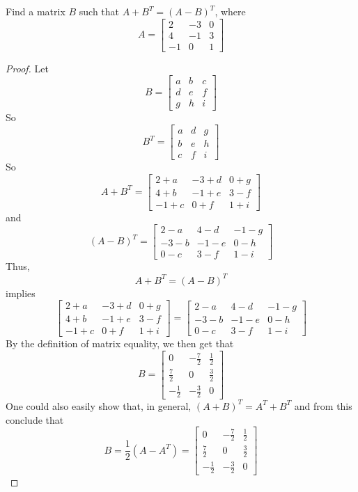 \begin{problem} \label{P.1.6}
    Find a matrix \( B \) such that \( A + B^T = (A-B)^T \), where
    \[
    A = \left[ 
    \begin{array}{ccc}
        2 & -3 & 0 \\
        4 & -1 & 3 \\
        -1 & 0 & 1
    \end{array}
    \right]
    \]
        
    \begin{proof}
        Let
        \[ B = \begin{bmatrix} a & b & c \\ d & e & f \\ g & h & i \end{bmatrix} \]
        So
        \[ B^T= \begin{bmatrix} a & d & g \\ b & e & h \\ c & f & i \end{bmatrix} \]
        So
        \[ A+B^T = \begin{bmatrix} 2+a & -3+d & 0+g \\ 4+b & -1+e & 3-f \\ -1+c & 0+f & 1+i \end{bmatrix} \]
        and
        \[ (A-B)^T = \begin{bmatrix} 2-a & 4-d & -1-g \\ -3-b & -1-e & 0-h \\ 0-c & 3-f & 1-i  \end{bmatrix} \]
        Thus,
        \[ A+B^T = (A-B)^T \]
        implies
        \[
        \begin{bmatrix} 2+a & -3+d & 0+g \\ 4+b & -1+e & 3-f \\ -1+c & 0+f & 1+i \end{bmatrix} = \begin{bmatrix} 2-a & 4-d & -1-g \\ -3-b & -1-e & 0-h \\ 0-c & 3-f & 1-i  \end{bmatrix}
        \]
        By the definition of matrix equality, we then get that
        \[ B = \left[ \begin{matrix} 0 & -\frac{7}{2} & \frac{1}{2} \\ \frac{7}{2} & 0 & \frac{3}{2} \\ -\frac{1}{2} & -\frac{3}{2} & 0 \end{matrix} \right] \]
        One could also easily show that, in general, \( (A+B)^T = A^T + B^T \) and from this conclude that
        \[
        B = \frac{1}{2}(A-A^T) = \left[ \begin{matrix} 0 & -\frac{7}{2} & \frac{1}{2} \\ \frac{7}{2} & 0 & \frac{3}{2} \\ -\frac{1}{2} & -\frac{3}{2} & 0 \end{matrix} \right]
        \]
    \end{proof}
\end{problem}

